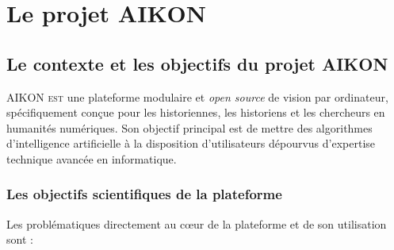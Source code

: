 \chapter[Le projet AIKON]{Le projet AIKON}

\section{Le contexte et les objectifs du projet AIKON}

\lettrine{A}{IKON est} une plateforme modulaire et \textit{open source} de vision par ordinateur, spécifiquement conçue pour les historiennes, les historiens et les chercheurs en humanités numériques. Son objectif principal est de mettre des algorithmes d'intelligence artificielle à la disposition d'utilisateurs dépourvus d'expertise technique avancée en informatique.


\subsection{Les objectifs scientifiques de la plateforme}
Les problématiques directement au c\oe ur de la plateforme et de son utilisation sont : 

